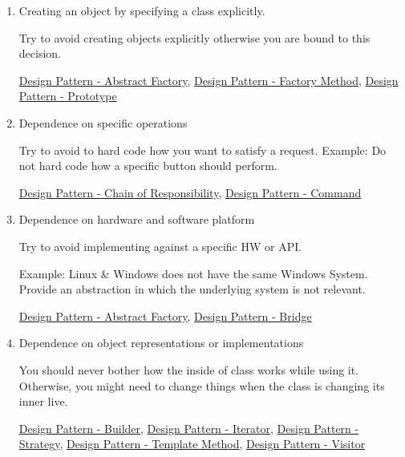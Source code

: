 \documentclass[11pt]{article}
\begin{document}
\begin{enumerate}
\item Creating an object by specifying a class explicitly.

Try to avoid creating objects explicitly otherwise you are bound to this decision.

\href{../../../../roam/20220413195148-design_pattern_abstract_factory.org}{Design Pattern - Abstract Factory}, \href{../../../../roam/20220413195351-design_pattern_factory_method.org}{Design Pattern - Factory Method}, \href{../../../../roam/20220413195501-design_pattern_prototype.org}{Design Pattern - Prototype}

\item Dependence on specific operations

Try to avoid to hard code how you want to satisfy a request.
Example: Do not hard code how a specific button should perform.

\href{../../../../roam/20220413200329-design_pattern_chain_of_responsibility.org}{Design Pattern - Chain of Responsibility}, \href{../../../../roam/20220413200356-design_pattern_command.org}{Design Pattern - Command}
\item Dependence on hardware and software platform

Try to avoid implementing against a specific HW or API.

Example: Linux \& Windows does not have the same Windows System.
Provide an abstraction in which the underlying system is not relevant.

\href{../../../../roam/20220413195148-design_pattern_abstract_factory.org}{Design Pattern - Abstract Factory}, \href{../../../../roam/20220413200620-design_pattern_bridge.org}{Design Pattern - Bridge}

\item Dependence on object representations or implementations

You should never bother how the inside of class works while using it.
Otherwise, you might need to change things when the class is changing its inner live.

\href{../../../../roam/20220413201034-design_pattern_builder.org}{Design Pattern - Builder}, \href{../../../../roam/20220413201100-design_pattern_iterator.org}{Design Pattern - Iterator}, \href{../../../../roam/20220413201128-design_pattern_strategy.org}{Design Pattern - Strategy}, \href{../../../../roam/20220413201147-design_pattern_template_method.org}{Design Pattern - Template Method}, \href{../../../../roam/20220413201212-design_pattern_visitor.org}{Design Pattern - Visitor}


\end{enumerate}
\end{document}
